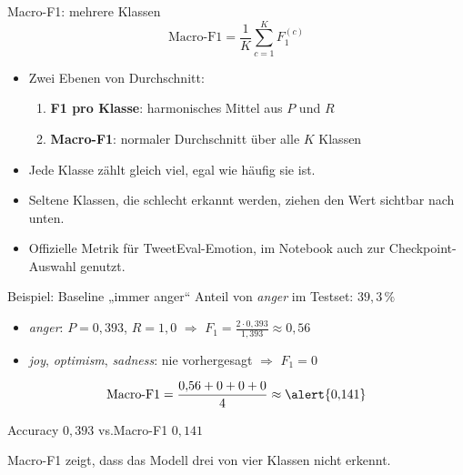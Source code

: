 \documentclass[aspectratio=169,11pt]{beamer}
\begin{document}
\begin{frame}{Macro-F1: mehrere Klassen}
  \[
    \text{Macro-F1} = \frac{1}{K} \sum_{c=1}^{K} F_1^{(c)}
  \]

  \begin{itemize}
    \item Zwei Ebenen von Durchschnitt:
      \begin{enumerate}
        \item \textbf{F1 pro Klasse}: harmonisches Mittel aus \(P\) und \(R\)
        \item \textbf{Macro-F1}: normaler Durchschnitt über alle \(K\) Klassen
      \end{enumerate}
    \item Jede Klasse zählt \alert{gleich viel}, egal wie häufig sie ist.
    \item Seltene Klassen, die schlecht erkannt werden, ziehen den Wert sichtbar nach unten.
    \item Offizielle Metrik für TweetEval-Emotion, im Notebook auch zur Checkpoint-Auswahl genutzt.
  \end{itemize}
\end{frame}

\begin{frame}{Beispiel: Baseline „immer anger“}
  Anteil von \emph{anger} im Testset: \(39{,}3\,\%\)

  \vspace{0.5em}
  \begin{itemize}
    \item \emph{anger}: \(P = 0{,}393\), \(R = 1{,}0\) \(\Rightarrow\) \(F_1 = \frac{2 \cdot 0{,}393}{1{,}393} \approx 0{,}56\)
    \item \emph{joy}, \emph{optimism}, \emph{sadness}: nie vorhergesagt \(\Rightarrow\) \(F_1 = 0\)
  \end{itemize}

  \vspace{0.5em}
  \[
    \text{Macro-F1} = \frac{0{,}56 + 0 + 0 + 0}{4} \approx \alert{0{,}141}
  \]

  \begin{center}
    Accuracy \(0{,}393\) \quad vs.\quad Macro-F1 \(0{,}141\)
  \end{center}
  Macro-F1 zeigt, dass das Modell \alert{drei von vier} Klassen nicht erkennt.
\end{frame}
\end{document}
